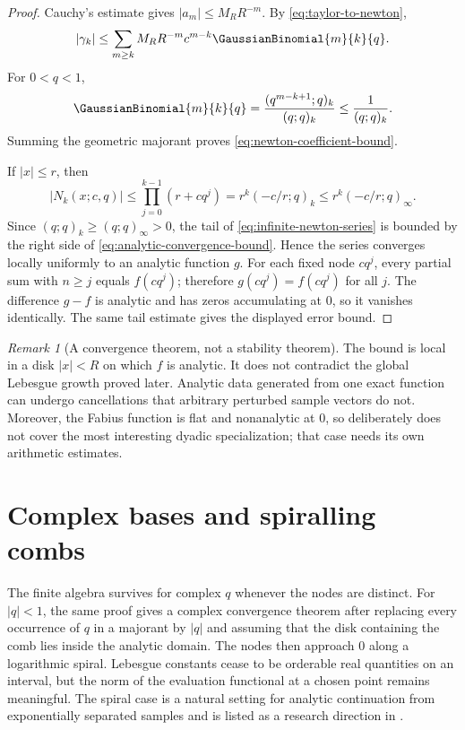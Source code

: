 \documentclass[11pt,oneside]{book}
\numberwithin{equation}{chapter}
\theoremstyle{definition}
\theoremstyle{remark}
\newtheorem{remark}[theorem]{Remark}
\begin{document}
\begin{proof}
Cauchy's estimate gives $|a_m|\le M_RR^{-m}$.  By
\eqref{eq:taylor-to-newton},
\[
 |\gamma_k|
 \le\sum_{m\ge k}M_RR^{-m}c^{m-k}\GaussianBinomial{m}{k}{q}.
\]
For $0<q<1$,
\[
 \GaussianBinomial{m}{k}{q}
 =\frac{(q^{m-k+1};q)_k}{(q;q)_k}
 \le\frac1{(q;q)_k}.
\]
Summing the geometric majorant proves
\eqref{eq:newton-coefficient-bound}.

If $|x|\le r$, then
\[
 |N_k(x;c,q)|
 \le\prod_{j=0}^{k-1}(r+cq^j)
 =r^k(-c/r;q)_k
 \le r^k(-c/r;q)_\infty.
\]
Since $(q;q)_k\ge(q;q)_\infty>0$, the tail of
\eqref{eq:infinite-newton-series} is bounded by the right side of
\eqref{eq:analytic-convergence-bound}.  Hence the series converges locally
uniformly to an analytic function $g$.  For each fixed node $cq^j$, every
partial sum with $n\ge j$ equals $f(cq^j)$; therefore $g(cq^j)=f(cq^j)$ for
all $j$.  The difference $g-f$ is analytic and has zeros accumulating at
$0$, so it vanishes identically.  The same tail estimate gives the displayed
error bound.
\end{proof}

\begin{remark}[A convergence theorem, not a stability theorem]
The bound is local in a disk $|x|<R$ on which $f$ is analytic.  It does not
contradict the global Lebesgue growth proved later.  Analytic data generated
from one exact function can undergo cancellations that arbitrary perturbed
sample vectors do not.  Moreover, the Fabius function is flat and
nonanalytic at $0$, so  deliberately
does not cover the most interesting dyadic specialization; that case needs
its own arithmetic estimates.
\end{remark}

\section{Complex bases and spiralling combs}

The finite algebra survives for complex $q$ whenever the nodes are distinct.
For $|q|<1$, the same proof gives a complex convergence theorem after
replacing every occurrence of $q$ in a majorant by $|q|$ and assuming that
the disk containing the comb lies inside the analytic domain.  The nodes
then approach $0$ along a logarithmic spiral.  Lebesgue constants cease to
be orderable real quantities on an interval, but the norm of the evaluation
functional at a chosen point remains meaningful.  The spiral case is a
natural setting for analytic continuation from exponentially separated
samples and is listed as a research direction in .
\end{document}
